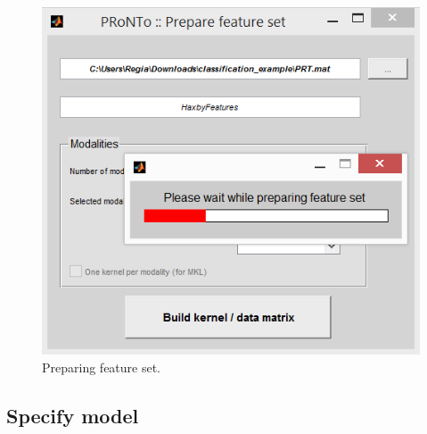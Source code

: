 \begin{itemize}
\begin{figure}[!h]
	\centering
		\includegraphics[scale=0.65]{images/Tutorial/classification/buildKernel.png}
	\caption{Preparing feature set.}
	\label{fig:buildKernel}
\end{figure}


\end{itemize}




\subsection{Specify model}

